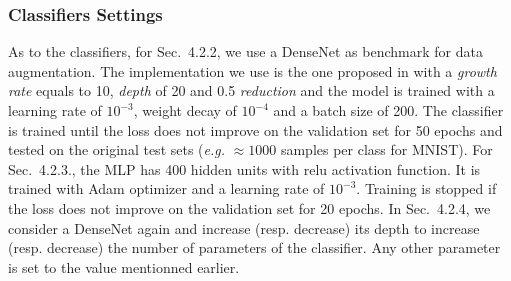 \documentclass[10pt,journal,compsoc]{IEEEtran}
\begin{document}
\subsubsection{Classifiers Settings}
As to the classifiers, for Sec.~4.2.2, we use a DenseNet \cite{huang_densely_2017} as benchmark for data augmentation. The implementation we use is the one proposed in \cite{amos_bamosdensenetpytorch_2020} with a \emph{growth rate} equals to 10, \emph{depth} of 20 and 0.5 \emph{reduction} and the model is trained with a learning rate of $10^{-3}$, weight decay of $10^{-4}$ and a batch size of 200. The classifier is trained until the loss does not improve on the validation set for 50 epochs and tested on the original test sets (\emph{e.g.} $\approx 1000$ samples per class for MNIST). For Sec.~4.2.3., the MLP has 400 hidden units with relu activation function. It is trained with Adam optimizer and a learning rate of  $10^{-3}$. Training is stopped if the loss does not improve on the validation set for 20 epochs. In Sec.~4.2.4, we consider a DenseNet again and increase (resp. decrease) its depth to increase (resp. decrease) the number of parameters of the classifier. Any other parameter is set to the value mentionned earlier.

%
\end{document}
